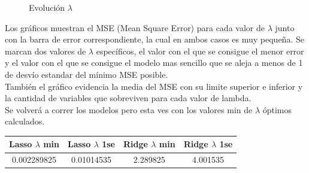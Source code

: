 \begin{figure}[h]
\centering
{}%
\hspace{0.25cm}%
\caption{Evolución $\lambda$}
\label{lambda}
\end{figure}



Los gráficos muestran el MSE (Mean Square Error) para cada valor de $\lambda$ junto con la barra de error correspondiente, la cual en ambos casos es muy pequeña. Se marcan dos valores de $\lambda$ específicos, el valor con el que se consigue el menor error y el valor con el que se consigue el modelo mas sencillo que se aleja a menos de 1 de desvío estandar del mínimo MSE posible. \\
También el gráfico evidencia la media del MSE con su limite superior e inferior y la cantidad de variables que sobreviven para cada valor de lambda.\\
Se volverá a correr los modelos pero esta ves con los valores min de $\lambda$ óptimos calculados.\\




\begin{center}
 \begin{tabular}{||c c c c||} 
 \hline
    Lasso $\lambda$ min & Lasso $\lambda$ 1se & Ridge $\lambda$ min & Ridge $\lambda$ 1se  \\ 
 \hline
    0.002289825	 & 0.01014535 & 2.289825 & 4.001535\\
 \hline
 \hline
\end{tabular}
\end{center}



